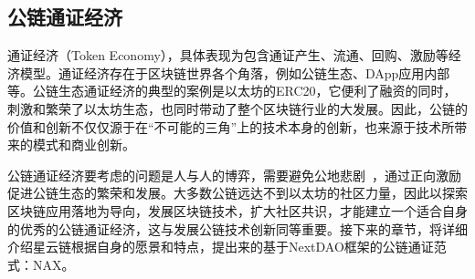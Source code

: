 \subsection{公链通证经济}
通证经济（Token Economy），具体表现为包含通证产生、流通、回购、激励等经济模型。通证经济存在于区块链世界各个角落，例如公链生态、DApp应用内部等。公链生态通证经济的典型的案例是以太坊的ERC20，它便利了融资的同时，刺激和繁荣了以太坊生态，也同时带动了整个区块链行业的大发展。因此，公链的价值和创新不仅仅源于在“不可能的三角”上的技术本身的创新，也来源于技术所带来的模式和商业创新。

公链通证经济要考虑的问题是人与人的博弈，需要避免公地悲剧~\cite{TragedyOfTheCommons}，通过正向激励促进公链生态的繁荣和发展。大多数公链远达不到以太坊的社区力量，因此以探索区块链应用落地为导向，发展区块链技术，扩大社区共识，才能建立一个适合自身的优秀的公链通证经济，这与发展公链技术创新同等重要。接下来的章节，将详细介绍星云链根据自身的愿景和特点，提出来的基于NextDAO框架的公链通证范式：NAX。
